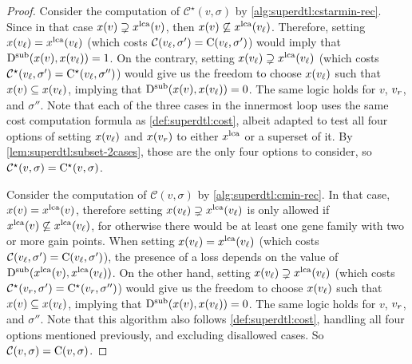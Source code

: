 \begin{proof}
    Consider the computation of \(\mathcal{C}^\star(v, \sigma)\) by \cref{alg:superdtl:cstarmin-rec}.
    Since in that case \(x(v) \supsetneq x^{\mathrm{lca}}(v)\), then \(x(v) \not\subseteq x^{\mathrm{lca}}(v_\mathit{\ell})\).
    Therefore, setting \(x(v_\mathit{\ell}) = x^{\mathrm{lca}}(v_\mathit{\ell})\) (which costs \(\mathcal{C}(v_\mathit{\ell}, \sigma') = \mathrm{C}(v_\mathit{\ell}, \sigma')\)) would imply that \(\mathrm{D}^\mathrm{sub}(x(v), x(v_\mathit{\ell})) = 1\).
    On the contrary, setting \(x(v_\mathit{\ell}) \supsetneq x^{\mathrm{lca}}(v_\mathit{\ell})\) (which costs \(\mathcal{C^\star}(v_\mathit{\ell}, \sigma') = \mathrm{C^\star}(v_\mathit{\ell}, \sigma'')\)) would give us the freedom to choose \(x(v_\mathit{\ell})\) such that \(x(v) \subseteq x(v_\mathit{\ell})\), implying that \(\mathrm{D}^\mathrm{sub}(x(v), x(v_\mathit{\ell})) = 0\).
    The same logic holds for \(v\), \(v_r\), and \(\sigma''\).
    Note that each of the three cases in the innermost loop uses the same cost computation formula as \cref{def:superdtl:cost}, albeit adapted to test all four options of setting \(x(v_\mathit{\ell})\) and \(x(v_r)\) to either \(x^{\mathrm{lca}}\) or a superset of it.
    By \cref{lem:superdtl:subset-2cases}, those are the only four options to consider, so \(\mathcal{C}^\star(v, \sigma) = \mathrm{C^\star}(v, \sigma)\).

    Consider the computation of \(\mathcal{C}(v, \sigma)\) by \cref{alg:superdtl:cmin-rec}.
    In that case, \(x(v) = x^{\mathrm{lca}}(v)\), therefore setting \(x(v_\mathit{\ell}) \supsetneq x^{\mathrm{lca}}(v_\mathit{\ell})\) is only allowed if \(x^{\mathrm{lca}}(v) \not\subseteq x^{\mathrm{lca}}(v_\mathit{\ell})\), for otherwise there would be at least one gene family with two or more gain points.
    When setting \(x(v_\mathit{\ell}) = x^{\mathrm{lca}}(v_\mathit{\ell})\) (which costs \(\mathcal{C}(v_\mathit{\ell}, \sigma') = \mathrm{C}(v_\mathit{\ell}, \sigma')\)), the presence of a loss depends on the value of \(\mathrm{D}^\mathrm{sub}(x^{\mathrm{lca}}(v), x^{\mathrm{lca}}(v_\mathit{\ell}))\).
    On the other hand, setting \(x(v_\mathit{\ell}) \supsetneq x^{\mathrm{lca}}(v_\mathit{\ell})\) (which costs \(\mathcal{C^\star}(v_r, \sigma') = \mathrm{C^\star}(v_r, \sigma'')\)) would give us the freedom to choose \(x(v_\mathit{\ell})\) such that \(x(v) \subseteq x(v_\mathit{\ell})\), implying that \(\mathrm{D}^\mathrm{sub}(x(v), x(v_\mathit{\ell})) = 0\).
    The same logic holds for \(v\), \(v_r\), and \(\sigma''\).
    Note that this algorithm also follows \cref{def:superdtl:cost}, handling all four options mentioned previously, and excluding disallowed cases.
    So \(\mathcal{C}(v, \sigma) = \mathrm{C}(v, \sigma)\).
\end{proof}

